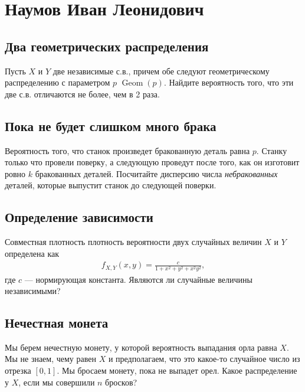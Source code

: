 \documentclass[12pt]{article}
\DeclareMathOperator{\Geom}{Geom}
\begin{document}
\newpage
\section{Наумов Иван Леонидович}

\subsection{Два геометрических распределения}

Пусть $X$ и $Y$ две независимые с.в., причем обе следуют геометрическому распределению с параметром $p$ $\Geom(p)$. Найдите вероятность того, что эти две с.в. отличаются не более, чем в 2 раза.



\subsection{Пока не будет слишком много брака}

Вероятность того, что станок произведет бракованную деталь равна $p$. Станку только что провели поверку, а следующую проведут после того, как он изготовит ровно $k$ бракованных деталей. Посчитайте дисперсию числа \emph{небракованных} деталей, которые выпустит станок до следующей поверки.



\subsection{Определение зависимости}

Совместная плотность плотность вероятности двух случайных величин $X$ и $Y$ определена как
\begin{align*}
    f_{X, Y}(x, y) = \frac{c}{1 + x^2 + y^2 + x^2y^2},
\end{align*}
где $c$ --- нормирующая константа. Являются ли случайные величины независимыми?



\subsection{Нечестная монета}

Мы берем нечестную монету, у которой вероятность выпадания орла равна $X$. Мы не знаем, чему равен $X$ и предполагаем, что это какое-то случайное число из отрезка $[0, 1]$. Мы бросаем монету, пока не выпадет орел. Какое распределение у $X$, если мы совершили $n$ бросков?
\end{document}
